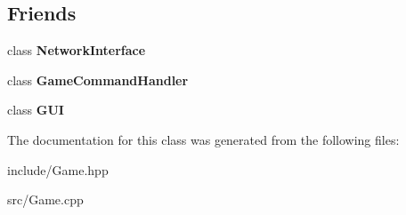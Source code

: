 \subsection*{Friends}
\begin{DoxyCompactItemize}
\item 
\hypertarget{class_game_ab35230e6cee8f196334bff4237ada67c}{class {\bfseries Network\-Interface}}\label{class_game_ab35230e6cee8f196334bff4237ada67c}

\item 
\hypertarget{class_game_a0ed0b4add492df212793740a98d31ef7}{class {\bfseries Game\-Command\-Handler}}\label{class_game_a0ed0b4add492df212793740a98d31ef7}

\item 
\hypertarget{class_game_ac5a3536de371167fdf200e8943f8c2b0}{class {\bfseries G\-U\-I}}\label{class_game_ac5a3536de371167fdf200e8943f8c2b0}

\end{DoxyCompactItemize}


The documentation for this class was generated from the following files\-:\begin{DoxyCompactItemize}
\item 
include/Game.\-hpp\item 
src/Game.\-cpp\end{DoxyCompactItemize}
